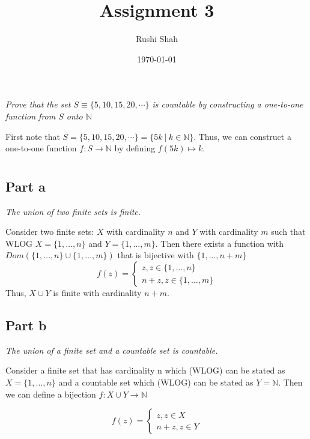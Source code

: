 \documentclass[]{article}
\author{Rushi Shah}
\date{\today}
\title{Assignment 3}
\newcommand{\naturals}{\mathbb{N}}
\begin{document}
	\maketitle



	\section{}
		\textit{Prove that the set $S \equiv \{5, 10, 15, 20, \cdots\}$ is countable by constructing a one-to-one function from $S$ onto $\naturals$}

			First note that $S = \{5, 10, 15, 20, \cdots\} = \{5k\ |\ k \in \naturals\}$. Thus, we can construct a one-to-one function $f : S \to \naturals$ by defining $f(5k) \mapsto k$. 


	\section{}
		\subsection*{Part a}
			\emph{The union of two finite sets is finite.}

			Consider two finite sets: $X$ with cardinality $n$ and $Y$ with cardinality $m$ such that WLOG $X = \{1,\ldots,n\}$ and $Y = \{1,\ldots,m\}$. Then there exists a function with $Dom(\{1,\ldots,n\} \cup \{1,\ldots,m\})$ that is bijective with $\{1, \ldots, n + m\}$
			\[f(z) = \begin{cases}
				z, z \in \{1,\ldots,n\} \\
				n + z, z \in \{1,\ldots,m\}
			\end{cases}\]
			Thus, $X \cup Y$ is finite with cardinality $n + m$. 
		\subsection*{Part b}
			\emph{The union of a finite set and a countable set is countable.}

			Consider a finite set that has cardinality n which (WLOG) can be stated as $X = \{1, \ldots, n\}$ and a countable set which (WLOG) can be stated as $Y = \naturals$. Then we can define a bijection $f : X \cup Y \to \naturals$

			\[f(z) = \begin{cases}
				z, z \in X \\
				n + z, z \in Y
			\end{cases}\]
\end{document}
